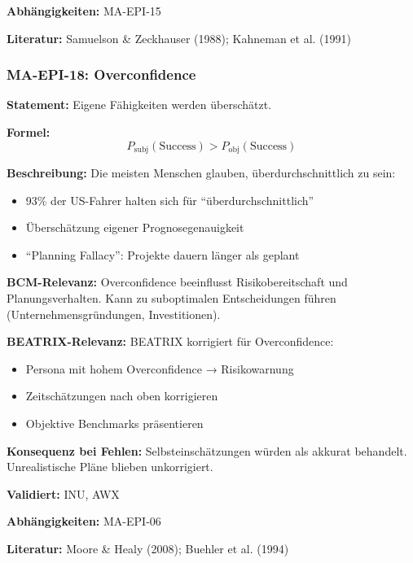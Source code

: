 \textbf{Abhängigkeiten:} MA-EPI-15

\textbf{Literatur:} Samuelson \& Zeckhauser (1988); Kahneman et al. (1991)


\subsubsection*{MA-EPI-18: Overconfidence}

\textbf{Statement:} Eigene Fähigkeiten werden überschätzt.

\textbf{Formel:}
\begin{equation}
P_{\text{subj}}(\text{Success}) > P_{\text{obj}}(\text{Success})
\end{equation}

\textbf{Beschreibung:}
Die meisten Menschen glauben, überdurchschnittlich zu sein:
\begin{itemize}
    \item 93\% der US-Fahrer halten sich für ``überdurchschnittlich''
    \item Überschätzung eigener Prognosegenauigkeit
    \item ``Planning Fallacy'': Projekte dauern länger als geplant
\end{itemize}

\textbf{BCM-Relevanz:}
Overconfidence beeinflusst Risikobereitschaft und Planungsverhalten. Kann zu suboptimalen Entscheidungen führen (Unternehmensgründungen, Investitionen).

\textbf{BEATRIX-Relevanz:}
BEATRIX korrigiert für Overconfidence:
\begin{itemize}
    \item Persona mit hohem Overconfidence → Risikowarnung
    \item Zeitschätzungen nach oben korrigieren
    \item Objektive Benchmarks präsentieren
\end{itemize}

\textbf{Konsequenz bei Fehlen:}
Selbsteinschätzungen würden als akkurat behandelt. Unrealistische Pläne blieben unkorrigiert.

\textbf{Validiert:} INU, AWX

\textbf{Abhängigkeiten:} MA-EPI-06

\textbf{Literatur:} Moore \& Healy (2008); Buehler et al. (1994)

